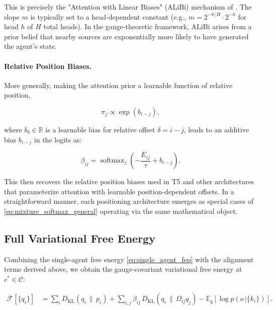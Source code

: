 \documentclass[twoside,11pt]{article}
\begin{document}
This is precisely the "Attention with Linear Biases" (ALiBi) mechanism of \citet{press2022train}. The slope $m$ is typically set to a head-dependent constant (e.g., $m = 2^{-8/H} \cdot 2^{-h}$ for head $h$ of $H$ total heads). In the gauge-theoretic framework, ALiBi arises from a prior belief that nearby sources are exponentially more likely to have generated the agent's state.

\paragraph{Relative Position Biases.}
More generally, making the attention prior a learnable function of relative position,

\begin{equation}
\pi_j \propto \exp(b_{i-j}),
\label{eq:relative_bias_prior}
\end{equation}

where $b_\delta \in \mathbb{R}$ is a learnable bias for relative offset $\delta = i - j$, leads to an additive bias $b_{i-j}$ in the logits as:

\begin{equation}
\beta_{ij} = \operatorname{softmax}_j\!\left(-\frac{E_{ij}}{\tau} + b_{i-j}\right).
\label{eq:relative_bias_attention}
\end{equation}

This then recovers the relative position biases used in T5 \citep{raffel2020exploring} and other architectures that parameterize attention with learnable position-dependent offsets. In a straightforward manner, each positioning architecture emerges as special cases of \eqref{eq:mixture_softmax_general} operating via the same mathematical object. 

\subsection{Full Variational Free Energy}
\label{sec:final_free_energy}

Combining the single-agent free energy \eqref{eq:single_agent_fep} with the alignment terms derived above, we obtain the gauge-covariant variational free energy at $c^* \in \mathcal{C}$:

\begin{equation}
\boxed{
\begin{aligned}
\mathcal{F}[\{q_i\}]
&=\sum_i D_{\mathrm{KL}}(q_i\,\|\,p_i)
+\sum_{i,j}\beta_{ij}\,D_{\mathrm{KL}}(q_i\,\|\,\Omega_{ij}q_j)
-\mathbb{E}_q[\log p(o\,|\{k_i\})].
\end{aligned}
}
\label{eq:free_energy_final}
\end{equation}
\end{document}
